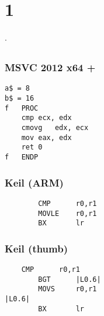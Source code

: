 \section{ 1}

.

\subsection{}

\subsubsection{MSVC 2012 x64 + }

\begin{lstlisting}
a$ = 8
b$ = 16
f	PROC
	cmp	ecx, edx
	cmovg	edx, ecx
	mov	eax, edx
	ret	0
f	ENDP
\end{lstlisting}

\subsubsection{Keil (ARM)}

\begin{lstlisting}
        CMP      r0,r1
        MOVLE    r0,r1
        BX       lr
\end{lstlisting}

\subsubsection{Keil (thumb)}
        
\begin{lstlisting}
	CMP      r0,r1
        BGT      |L0.6|
        MOVS     r0,r1
|L0.6|
        BX       lr
\end{lstlisting}

